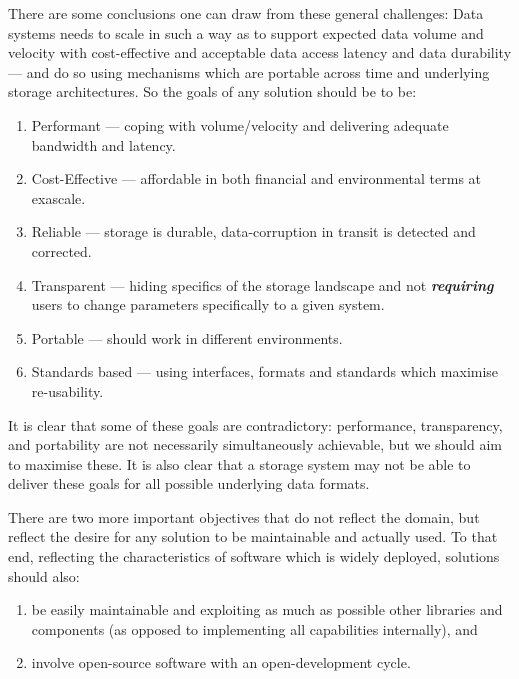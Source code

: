 There are some conclusions one can draw from these general challenges:
Data systems needs to scale in such a way as to support expected data volume and velocity with cost-effective
and acceptable data access latency and data durability --- and do so using mechanisms which are portable across time and underlying storage architectures.
So the goals of any solution should be to be:
\begin{enumerate}
\item Performant --- coping with volume/velocity and delivering adequate bandwidth and latency.
\item Cost-Effective --- affordable in both financial and environmental terms  at exascale.
\item Reliable --- storage is durable, data-corruption in transit is detected and corrected.
\item Transparent --- hiding specifics of the storage landscape and not \textit{\textbf{requiring}} users to change parameters specifically to a given system.
\item Portable --- should work in different environments.
\item Standards based --- using interfaces, formats and standards which maximise re-usability.
\end{enumerate}

It is clear that some of these goals are contradictory:
performance, transparency, and portability are not necessarily simultaneously achievable,
but we should aim to maximise these.
It is also clear that a storage system may not be able to deliver these goals for all possible underlying data formats.

There are two more important objectives that do not reflect the domain, but reflect the desire for any solution to be maintainable and actually used.
To that end, reflecting the characteristics of software which is widely deployed, solutions should also:
\begin{enumerate}[resume]
\item be easily maintainable and exploiting as much as possible other libraries and components (as opposed to implementing all capabilities internally), and
\item involve open-source software with an open-development cycle.
\end{enumerate}
